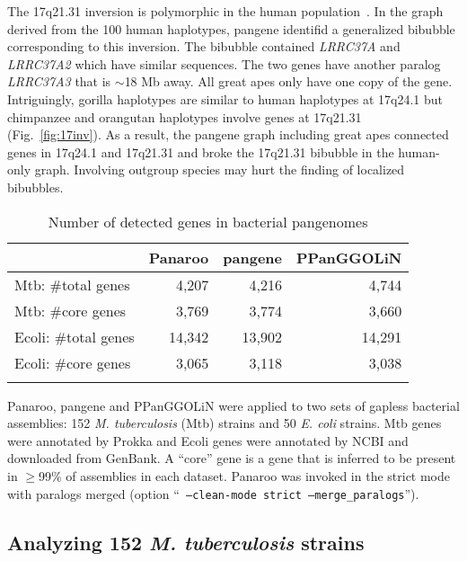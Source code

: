 \documentclass[webpdf,contemporary,large,namedate]{oup-authoring-template}%
\begin{document}
The 17q21.31 inversion is polymorphic in the human population~\citep{Boettger:2012aa,Steinberg:2012aa}.
In the graph derived from the 100 human haplotypes, pangene identifid a generalized bibubble corresponding to this inversion.
The bibubble contained \emph{LRRC37A} and \emph{LRRC37A2} which have similar sequences.
The two genes have another paralog \emph{LRRC37A3} that is $\sim$18 Mb away.
All great apes only have one copy of the gene.
Intriguingly, gorilla haplotypes are similar to human haplotypes at 17q24.1
but chimpanzee and orangutan haplotypes involve genes at 17q21.31 (Fig.~\ref{fig:17inv}).
As a result, the pangene graph including great apes connected genes in 17q24.1 and 17q21.31
and broke the 17q21.31 bibubble in the human-only graph.
Involving outgroup species may hurt the finding of localized bibubbles.

\begin{table}[!tb]
\caption{Number of detected genes in bacterial pangenomes\label{tab:bac}}
\begin{tabular*}{\columnwidth}{@{\extracolsep\fill}lrrr@{\extracolsep\fill}}
\toprule
& Panaroo & pangene & PPanGGOLiN \\
\midrule
Mtb: \#total genes   & 4,207  & 4,216  & 4,744  \\
Mtb: \#core genes    & 3,769  & 3,774  & 3,660  \\
Ecoli: \#total genes & 14,342 & 13,902 & 14,291 \\
Ecoli: \#core genes  & 3,065  & 3,118  & 3,038  \\
\botrule
\end{tabular*}
\begin{tablenotes}
\item Panaroo, pangene and PPanGGOLiN were applied to two sets of gapless bacterial assemblies:
152 \emph{M. tuberculosis} (Mtb) strains and 50 \emph{E. coli} strains.
Mtb genes were annotated by Prokka and Ecoli genes were annotated by NCBI and downloaded from GenBank.
A ``core'' gene is a gene that is inferred to be present in $\ge$99\% of assemblies in each dataset.
Panaroo was invoked in the strict mode with paralogs merged (option ``{\tt
--clean-mode strict --merge\_paralogs}'').
\end{tablenotes}
\end{table}

\subsection{Analyzing 152 \textit{M. tuberculosis} strains}
\end{document}
